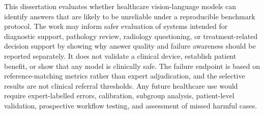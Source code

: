 This dissertation evaluates whether healthcare vision-language models can identify answers that are likely to be unreliable under a reproducible benchmark protocol. The work may inform safer evaluation of systems intended for diagnostic support, pathology review, radiology questioning, or treatment-related decision support by showing why answer quality and failure awareness should be reported separately. It does not validate a clinical device, establish patient benefit, or show that any model is clinically safe. The failure endpoint is based on reference-matching metrics rather than expert adjudication, and the selective results are not clinical referral thresholds. Any future healthcare use would require expert-labelled errors, calibration, subgroup analysis, patient-level validation, prospective workflow testing, and assessment of missed harmful cases.
